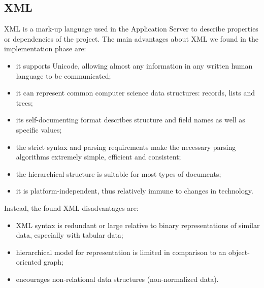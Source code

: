 \subsection{XML}
\label{subsect:XML}
XML is a mark-up language used in the Application Server to describe properties or dependencies of the project. The main advantages about XML we found in the implementation phase are:
\begin{itemize}
\item it supports Unicode, allowing almost any information in any written human language to be communicated;
\item it can represent common computer science data structures: records, lists and trees;
\item its self-documenting format describes structure and field names as well as specific values;
\item the strict syntax and parsing requirements make the necessary parsing algorithms extremely simple, efficient and consistent;
\item the hierarchical structure is suitable for most types of documents;
\item it is platform-independent, thus relatively immune to changes in technology.
\end{itemize}
Instead, the found XML disadvantages are:
\begin{itemize}
\item XML syntax is redundant or large relative to binary representations of similar data, especially with tabular data;
\item hierarchical model for representation is limited in comparison to an object-oriented graph;
\item encourages non-relational data structures (non-normalized data).
\end{itemize}
